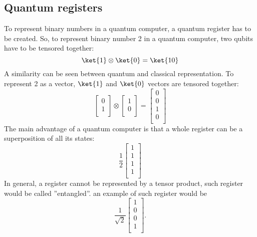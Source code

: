 \documentclass[12pt]{report}
\begin{document}
\subsection{Quantum registers}
To represent binary numbers in a quantum computer, a quantum register has to be created. So, to represent binary number 2 in a quantum computer, two qubits have to be tensored together:
\begin{equation}
\ket{1} \otimes \ket{0} = \ket{10}
\end{equation}
A similarity can be seen between quantum and classical representation. To represent 2 as a vector, $\ket{1}$ and $\ket{0}$ vectors are tensored together:
\begin{equation}
\left[
\begin{array}{c}
0 \\
1 \\
\end{array}
\right]
\otimes
\left[
\begin{array}{c}
1 \\
0 \\
\end{array}
\right]
= \left[ \begin{array}{c}
0 \\
0 \\
1 \\
0 \\
\end{array} \right]
\end{equation}
The main advantage of a quantum computer is that a whole register can be a superposition of all its states:
\begin{equation}
\frac{1}{2} \left[ \begin{array}{c}
1 \\
1 \\
1 \\
1 \\
\end{array} \right]
\end{equation}
In general, a register cannot be represented by a tensor product, such register would be called ''entangled''. an example of such register would be
\begin{equation}
\frac{1}{\sqrt2} \left[ \begin{array}{c}
1 \\
0 \\
0 \\
1 \\
\end{array} \right].
\end{equation}
\end{document}
